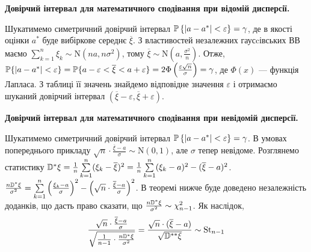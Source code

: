 \noindent\textbf{Довірчий інтервал для математичного сподівання при відомій дисперсії.}

Шукатимемо симетричний довірчий інтервал $\P\left\{|a - a^*| < \varepsilon\right\} = \gamma$, де в якості
оцінки $a^*$ буде вибіркове середнє $\overline{\xi}$. З властивостей незалежних гаусcівських ВВ
маємо $\sum\limits_{k=1}^n \xi_k \sim \mathrm{N}(na, n\sigma^2)$, тому $\overline{\xi} \sim \mathrm{N}\left(a, \frac{\sigma^2}{n}\right)$.
Отже,
$
    \P\{|a - a^*| < \varepsilon\} = \P \{a - \varepsilon < \overline{\xi} < a + \varepsilon\} = 
    2\Phi\left(\frac{\varepsilon\sqrt{n}}{\sigma}\right) = \gamma
$, де $\Phi(x)$ --- функція Лапласа. З таблиці її значень знайдемо відповідне значення $\varepsilon$ і отримаємо шуканий
довірчий інтервал $\left(\overline{\xi}-\varepsilon, \overline{\xi}+\varepsilon \right)$.

\noindent\textbf{Довірчий інтервал для математичного сподівання при невідомій дисперсії.}

Шукатимемо симетричний довірчий інтервал $\P\left\{|a - a^*| < \varepsilon\right\} = \gamma$. В умовах попереднього прикладу
$\sqrt{n} \cdot \frac{\overline{\xi} - a}{\sigma} \sim \mathrm{N}(0, 1)$, але $\sigma$ тепер невідоме. Розглянемо статистику
$\D^* \xi = \frac{1}{n}\sum\limits_{k=1}^n (\xi_k - \overline{\xi})^2 = \frac{1}{n} \sum\limits_{k=1}^n (\xi_k - a)^2 - (\overline{\xi} - a)^2$.
$\frac{n \D^* \xi}{\sigma^2} = \sum\limits_{k=1}^n \left(\frac{\xi_k - a}{\sigma} \right)^2 - 
\left(\sqrt{n} \cdot \frac{\overline{\xi} - a}{\sigma} \right)^2$. В теоремі нижче буде доведено незалежність доданків,
що дасть право сказати, що $\frac{n \D^* \xi}{\sigma^2} \sim \chi_{n-1}^2$. Як наслідок,
$$ 
\frac{\sqrt{n}\cdot\frac{\overline{\xi} - a}{\sigma}}{\sqrt{\frac{1}{n-1} \cdot \frac{n \D^* \xi}{\sigma^2} }} = 
\frac{\sqrt{n}\cdot(\overline{\xi} - a)}{\sqrt{\D^{**}\xi}} \sim \mathrm{St}_{n-1}
$$

